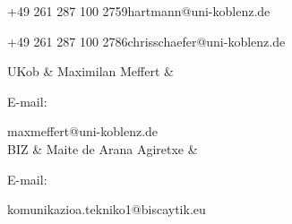 \documentclass[external]{20120615_deliverable_template_ukob}
\theoremstyle{definition}
\begin{document}
\begin{LGhistory}

\end{LGhistory}


\newcommand{\LGaddauthorNoPhone}[3]{\hline  #1 &  #2 & %
   \parbox{3em}{E-mail:} \small #3 \\
}

\begin{LGauthors}

%
{+49 261 287 100 2759}{\small hartmann@uni-koblenz.de}

%
{+49 261 287 100 2786}{\small chrisschaefer@uni-koblenz.de}

\LGaddauthorNoPhone{UKob}{Maximilan Meffert}%
{\small maxmeffert@uni-koblenz.de}

\LGaddauthorNoPhone{BIZ}{Maite de Arana Agiretxe}%
{\small komunikazioa.tekniko1@biscaytik.eu}



\end{LGauthors}
\end{document}
